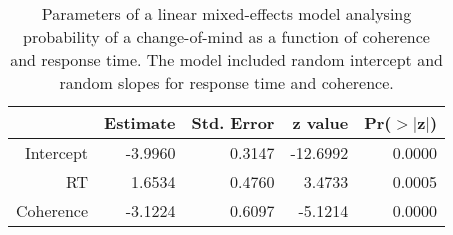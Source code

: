 \begin{table*}[t]
\centering
\caption{Parameters of a linear mixed-effects model analysing probability of a change-of-mind 
                            as a function of coherence and response time. The model included random intercept and random 
                            slopes for response time and coherence.} 
\label{tab:is_com_vs_RT}
\begin{tabular}{rrrrr}
  \toprule
 & Estimate & Std. Error & z value & Pr($>$$|$z$|$) \\ 
  \midrule
Intercept & -3.9960 & 0.3147 & -12.6992 & 0.0000 \\ 
  RT & 1.6534 & 0.4760 & 3.4733 & 0.0005 \\ 
  Coherence & -3.1224 & 0.6097 & -5.1214 & 0.0000 \\ 
   \bottomrule
\end{tabular}
\end{table*}
